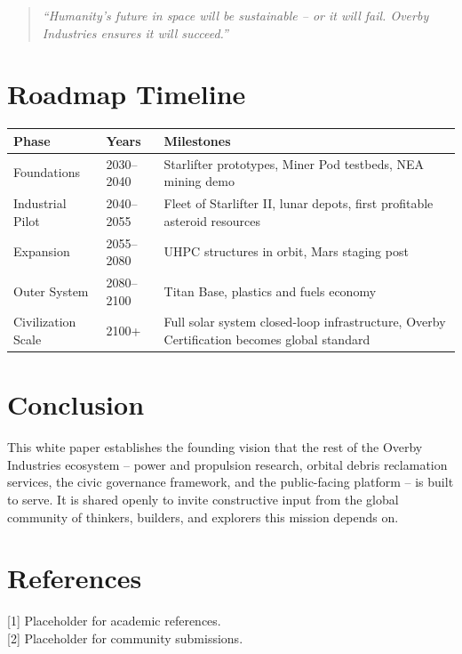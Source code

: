 \documentclass[12pt]{article}
\begin{document}
\begin{quote}
\textit{``Humanity's future in space will be sustainable -- or it will fail. Overby Industries ensures it will succeed.''}
\end{quote}

\section{Roadmap Timeline}

\begin{longtable}{p{3cm} p{2.2cm} p{8cm}}
\textbf{Phase} & \textbf{Years} & \textbf{Milestones} \\
\hline
\endhead
Foundations & 2030--2040 & Starlifter prototypes, Miner Pod testbeds, NEA mining demo \\
Industrial Pilot & 2040--2055 & Fleet of Starlifter II, lunar depots, first profitable asteroid resources \\
Expansion & 2055--2080 & UHPC structures in orbit, Mars staging post \\
Outer System & 2080--2100 & Titan Base, plastics and fuels economy \\
Civilization Scale & 2100+ & Full solar system closed-loop infrastructure, Overby Certification becomes global standard \\
\end{longtable}

\section{Conclusion}
This white paper establishes the founding vision that the rest of the Overby Industries ecosystem -- power and propulsion research, orbital debris reclamation services, the civic governance framework, and the public-facing platform -- is built to serve. It is shared openly to invite constructive input from the global community of thinkers, builders, and explorers this mission depends on.

\section{References}
[1] Placeholder for academic references.\\{}
[2] Placeholder for community submissions.
\end{document}
